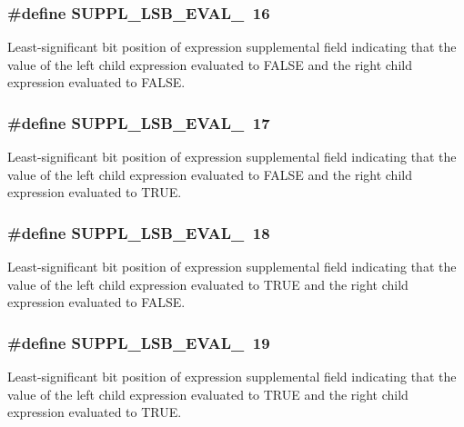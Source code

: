 \subsubsection{\setlength{\rightskip}{0pt plus 5cm}\#define SUPPL\_\-LSB\_\-EVAL\_\ 16}\label{group__expr__suppl_a11}


Least-significant bit position of expression supplemental field indicating that the value of the left child expression evaluated to FALSE and the right child expression evaluated to FALSE. 
\subsubsection{\setlength{\rightskip}{0pt plus 5cm}\#define SUPPL\_\-LSB\_\-EVAL\_\ 17}\label{group__expr__suppl_a12}


Least-significant bit position of expression supplemental field indicating that the value of the left child expression evaluated to FALSE and the right child expression evaluated to TRUE. 
\subsubsection{\setlength{\rightskip}{0pt plus 5cm}\#define SUPPL\_\-LSB\_\-EVAL\_\ 18}\label{group__expr__suppl_a13}


Least-significant bit position of expression supplemental field indicating that the value of the left child expression evaluated to TRUE and the right child expression evaluated to FALSE. 
\subsubsection{\setlength{\rightskip}{0pt plus 5cm}\#define SUPPL\_\-LSB\_\-EVAL\_\ 19}\label{group__expr__suppl_a14}


Least-significant bit position of expression supplemental field indicating that the value of the left child expression evaluated to TRUE and the right child expression evaluated to TRUE. 
